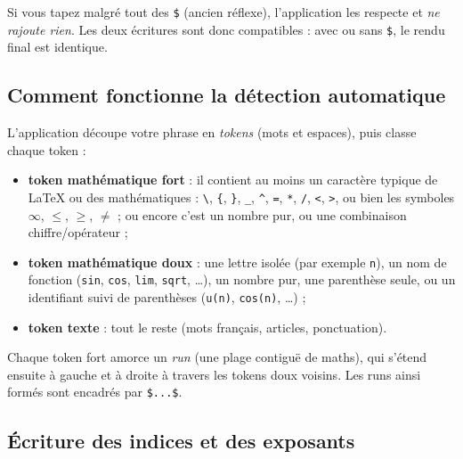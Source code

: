 \documentclass[11pt,a4paper]{article}
\begin{document}
\begin{attention}
Si vous tapez malgré tout des \texttt{\$} (ancien réflexe), l'application les
respecte et \emph{ne rajoute rien}. Les deux écritures sont donc compatibles :
avec ou sans \texttt{\$}, le rendu final est identique.
\end{attention}

\subsection{Comment fonctionne la détection automatique}

L'application découpe votre phrase en \emph{tokens} (mots et espaces), puis
classe chaque token :

\begin{itemize}
  \item \textbf{token mathématique fort} : il contient au moins un caractère
        typique de \LaTeX{} ou des mathématiques : \verb|\|, \verb|{|, \verb|}|,
        \verb|_|, \verb|^|, \verb|=|, \verb|*|, \verb|/|, \verb|<|, \verb|>|,
        ou bien les symboles $\infty$, $\leq$, $\geq$, $\neq$ ; ou encore c'est
        un nombre pur, ou une combinaison chiffre/opérateur ;
  \item \textbf{token mathématique doux} : une lettre isolée (par exemple
        \texttt{n}), un nom de fonction (\texttt{sin}, \texttt{cos},
        \texttt{lim}, \texttt{sqrt}, \dots), un nombre pur, une parenthèse
        seule, ou un identifiant suivi de parenthèses (\texttt{u(n)},
        \texttt{cos(n)}, \dots) ;
  \item \textbf{token texte} : tout le reste (mots français, articles,
        ponctuation).
\end{itemize}

Chaque token fort amorce un \emph{run} (une plage contiguë de maths), qui
s'étend ensuite à gauche et à droite à travers les tokens doux voisins. Les
runs ainsi formés sont encadrés par \texttt{\$...\$}.

\subsection{Écriture des indices et des exposants}
\end{document}
